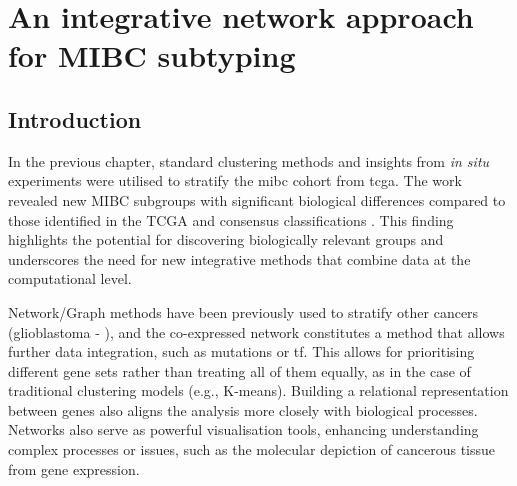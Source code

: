\chapter{An integrative network approach for MIBC subtyping} \label{s:N_I}


\vspace{3mm}
\vspace{3mm}


\section{Introduction}

In the previous chapter, standard clustering methods and insights from \textit{in situ} experiments \citep{Baker2022-bj} were utilised to stratify the \acrfull{mibc} cohort from \acrfull{tcga}. The work revealed new MIBC subgroups with significant biological differences compared to those identified in the TCGA and consensus classifications \citep{Robertson2017-mg,Kamoun2020-tj}. This finding highlights the potential for discovering biologically relevant groups and underscores the need for new integrative methods that combine data at the computational level.

Network/Graph methods have been previously used to stratify other cancers (glioblastoma - \citet{Care2019-ij}), and the co-expressed network constitutes a method that allows further data integration, such as mutations or \acrfull{tf}. This allows for prioritising different gene sets rather than treating all of them equally, as in the case of traditional clustering models (e.g., K-means). Building a relational representation between genes also aligns the analysis more closely with biological processes. Networks also serve as powerful visualisation tools, enhancing understanding complex processes or issues, such as the molecular depiction of cancerous tissue from gene expression.

